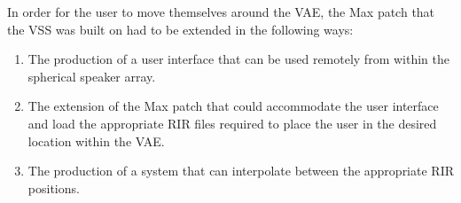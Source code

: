 \documentclass[../../main.tex]{subfiles}
\begin{document}



		

		In order for the user to move themselves around the \ac{VAE}, the Max patch that the \ac{VSS} was built on had to be extended in the following ways:

		\begin{enumerate}

			\item The production of a user interface that can be used remotely from within the spherical speaker array. \\

			\item The extension of the Max patch that could accommodate the user interface and load the appropriate \ac{RIR} files required to place the user in the desired location within the \ac{VAE}. \\

			\item The production of a system that can interpolate between the appropriate \ac{RIR} positions.

		\end{enumerate}
\end{document}
